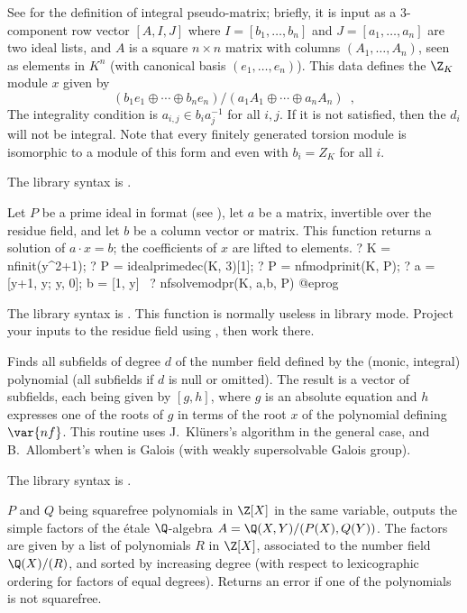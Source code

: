See  for the definition of integral pseudo-matrix;
briefly, it is input as a 3-component row vector $[A,I,J]$ where
$I = [b_1,\dots,b_n]$ and $J = [a_1,\dots,a_n]$ are two ideal lists,
and $A$ is a square $n\times n$ matrix with columns $(A_1,\dots,A_n)$,
seen as elements in $K^n$ (with canonical basis $(e_1,\dots,e_n)$).
This data defines the $\Z_K$ module $x$ given by
$$ (b_1e_1\oplus\cdots\oplus b_ne_n) / (a_1A_1\oplus\cdots\oplus a_nA_n)
\enspace, $$
The integrality condition is $a_{i,j} \in b_i a_j^{-1}$ for all $i,j$. If it
is not satisfied, then the $d_i$ will not be integral. Note that every
finitely generated torsion module is isomorphic to a module of this form and
even with $b_i=Z_K$ for all $i$.

The library syntax is .

\label{se:nfsolvemodpr}
Let $P$ be a prime ideal in  format (see ),
let $a$ be a matrix, invertible over the residue field, and let $b$ be
a column vector or matrix. This function returns a solution of $a\cdot x =
b$; the coefficients of $x$ are lifted to  elements.
\bprog
? K = nfinit(y^2+1);
? P = idealprimedec(K, 3)[1];
? P = nfmodprinit(K, P);
? a = [y+1, y; y, 0]; b = [1, y]~
? nfsolvemodpr(K, a,b, P)
@eprog

The library syntax is .
This function is normally useless in library mode. Project your
inputs to the residue field using , then work there.

\label{se:nfsubfields}
Finds all subfields of degree
$d$ of the number field defined by the (monic, integral) polynomial
 (all subfields if $d$ is null or omitted). The result is a vector
of subfields, each being given by $[g,h]$, where $g$ is an absolute equation
and $h$ expresses one of the roots of $g$ in terms of the root $x$ of the
polynomial defining $\var{nf}$. This routine uses J.~Kl\"uners's algorithm
in the general case, and B.~Allombert's  when 
is Galois (with weakly supersolvable Galois group).

The library syntax is .

\label{se:polcompositum}
 $P$ and $Q$
being squarefree polynomials in $\Z[X]$ in the same variable, outputs
the simple factors of the \'etale $\Q$-algebra $A = \Q(X, Y) / (P(X), Q(Y))$.
The factors are given by a list of polynomials $R$ in $\Z[X]$, associated to
the number field $\Q(X)/ (R)$, and sorted by increasing degree (with respect
to lexicographic ordering for factors of equal degrees). Returns an error if
one of the polynomials is not squarefree.

